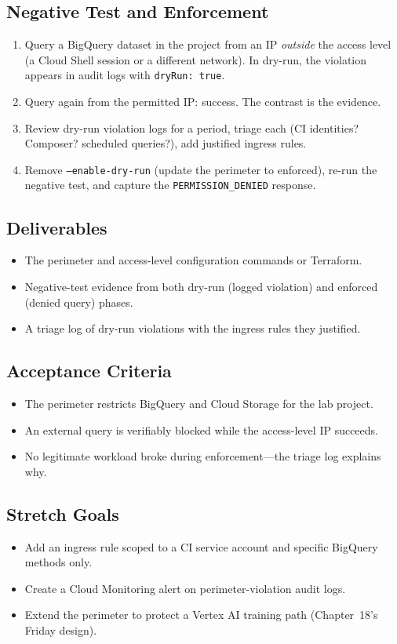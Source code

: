 \subsection{Negative Test and Enforcement}
\begin{enumerate}
    \item Query a BigQuery dataset in the project from an IP \emph{outside} the access level (a Cloud Shell session or a different network). In dry-run, the violation appears in audit logs with \texttt{dryRun: true}.
    \item Query again from the permitted IP: success. The contrast is the evidence.
    \item Review dry-run violation logs for a period, triage each (CI identities? Composer? scheduled queries?), add justified ingress rules.
    \item Remove \texttt{--enable-dry-run} (update the perimeter to enforced), re-run the negative test, and capture the \texttt{PERMISSION\_DENIED} response.
\end{enumerate}

\subsection*{Deliverables}
\begin{itemize}
    \item The perimeter and access-level configuration commands or Terraform.
    \item Negative-test evidence from both dry-run (logged violation) and enforced (denied query) phases.
    \item A triage log of dry-run violations with the ingress rules they justified.
\end{itemize}

\subsection*{Acceptance Criteria}
\begin{itemize}
    \item The perimeter restricts BigQuery and Cloud Storage for the lab project.
    \item An external query is verifiably blocked while the access-level IP succeeds.
    \item No legitimate workload broke during enforcement---the triage log explains why.
\end{itemize}

\subsection*{Stretch Goals}
\begin{itemize}
    \item Add an ingress rule scoped to a CI service account and specific BigQuery methods only.
    \item Create a Cloud Monitoring alert on perimeter-violation audit logs.
    \item Extend the perimeter to protect a Vertex AI training path (Chapter~18's Friday design).
\end{itemize}

